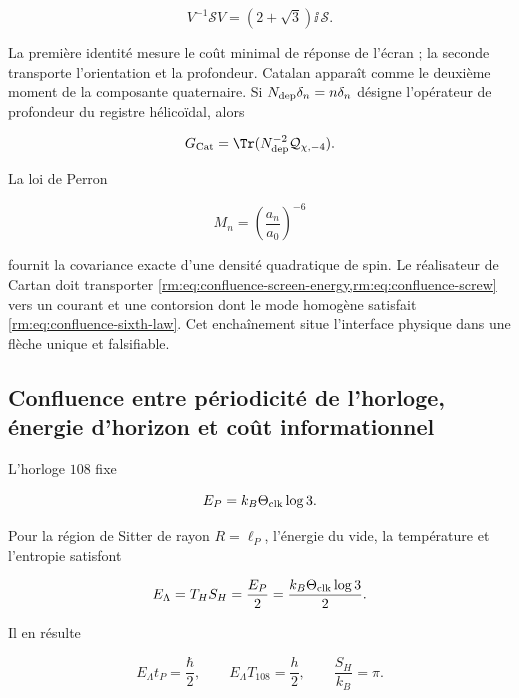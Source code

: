 \begin{equation}
 \boxed{
 V^{-1}\mathscr SV=(2+\sqrt3)\ii\,\mathscr S.}
 \label{rm:eq:confluence-screw}
\end{equation}

La première identité mesure le coût minimal de réponse de l’écran ; la seconde transporte l’orientation et la profondeur. Catalan apparaît comme le deuxième moment de la composante quaternaire. Si \(N_{\rm dep}\delta_n=n\delta_n\) désigne l’opérateur de profondeur du registre hélicoïdal, alors

\begin{equation}
 G_{\rm Cat}=\Tr(N_{\rm dep}^{-2}\mathcal Q_{\chi,-4}).
 \label{rm:eq:confluence-catalan}
\end{equation}

La loi de Perron

\begin{equation}
 M_n=\left(\frac{a_n}{a_0}\right)^{-6}
 \label{rm:eq:confluence-sixth-law}
\end{equation}

fournit la covariance exacte d’une densité quadratique de spin. Le réalisateur de Cartan doit transporter \cref{rm:eq:confluence-screen-energy,rm:eq:confluence-screw} vers un courant et une contorsion dont le mode homogène satisfait \cref{rm:eq:confluence-sixth-law}. Cet enchaînement situe l’interface physique dans une flèche unique et falsifiable.

\subsection{Confluence entre périodicité de l’horloge, énergie d’horizon et coût informationnel}

L’horloge \(108\) fixe

\begin{equation}
 E_P=k_B\Theta_{\rm clk}\log3.
 \label{rm:eq:confluence-planck-trit}
\end{equation}

Pour la région de Sitter de rayon \(R=\ell_P\), l’énergie du vide, la température et l’entropie satisfont

\begin{equation}
 E_\Lambda=T_H S_H=\frac{E_P}{2}
 =\frac{k_B\Theta_{\rm clk}\log3}{2}.
 \label{rm:eq:confluence-horizon-half}
\end{equation}

Il en résulte

\begin{equation}
 E_\Lambda t_P=\frac{\hbar}{2},
 \qquad
 E_\Lambda T_{108}=\frac{h}{2},
 \qquad
 \frac{S_H}{k_B}=\pi.
 \label{rm:eq:confluence-half-action}
\end{equation}

